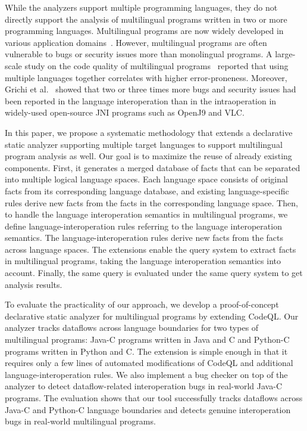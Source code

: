 While the analyzers support multiple programming languages, they do not directly
support the analysis of multilingual programs written in two or more
programming languages. Multilingual programs are now widely developed in
various application domains~\cite{kochhar2016large, mergendahlcross}. However,
multilingual programs are often vulnerable to bugs or security issues more than
monolingual programs. A large-scale study on the code quality of multilingual
programs~\cite{kochhar2016large} reported that using multiple languages
together correlates with higher error-proneness. Moreover,
Grichi et al.~\cite{grichi2020impact} showed that two or three times more bugs and security
issues had been reported in the language interoperation than in the
intraoperation in widely-used open-source JNI programs such as OpenJ9 and VLC.

In this paper, we propose a systematic methodology that extends a
declarative static analyzer supporting multiple target languages to support
multilingual program analysis as well. Our goal is to maximize the reuse of
already existing components. First, it generates a merged database of facts that can
be separated into multiple logical language spaces.  Each language space
consists of original facts from its corresponding language database, and existing
language-specific rules derive new facts from the facts in the corresponding
language space. Then, to handle the language interoperation semantics in
multilingual programs, we define language-interoperation rules referring to
the language interoperation semantics. The language-interoperation rules derive new
facts from the facts across language spaces. The extensions enable the query system
to extract facts in multilingual programs, taking the language
interoperation semantics into account.
Finally, the same query is evaluated under the same query system to get
analysis results.

To evaluate the practicality of our approach, we develop a proof-of-concept
declarative static analyzer for multilingual programs by extending CodeQL. Our
analyzer tracks dataflows across language boundaries for two types of
multilingual programs: Java-C programs written in Java and C and Python-C
programs written in Python and C. The extension is simple enough in that
it requires only a few lines of automated modifications of CodeQL and additional
language-interoperation rules. We also implement a bug checker on top of
the analyzer to detect dataflow-related interoperation bugs in real-world Java-C programs.
The evaluation shows that our tool successfully tracks dataflows across
Java-C and Python-C language boundaries and detects genuine interoperation
bugs in real-world multilingual programs.


